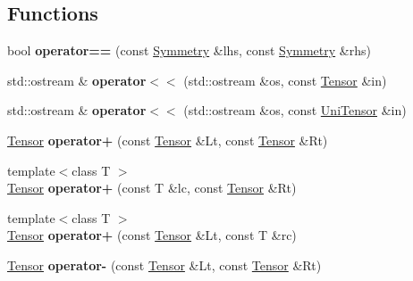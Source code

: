 \subsection*{Functions}
\begin{DoxyCompactItemize}
\item 
\mbox{\label{namespacecytnx_ae6b20189964ca74ff03eb7565dc0b8cd}} 
bool {\bfseries operator==} (const \hyperlink{classcytnx_1_1Symmetry}{Symmetry} \&lhs, const \hyperlink{classcytnx_1_1Symmetry}{Symmetry} \&rhs)
\item 
\mbox{\label{namespacecytnx_a651e9fae9c180966bc3655999e473a78}} 
std\+::ostream \& {\bfseries operator$<$$<$} (std\+::ostream \&os, const \hyperlink{classcytnx_1_1Tensor}{Tensor} \&in)
\item 
\mbox{\label{namespacecytnx_a82ae0f76259f95cfe10256e8c3454921}} 
std\+::ostream \& {\bfseries operator$<$$<$} (std\+::ostream \&os, const \hyperlink{classcytnx_1_1UniTensor}{Uni\+Tensor} \&in)
\item 
\mbox{\label{namespacecytnx_a067e7063e7cc7a80c9c91d8998ab7134}} 
\hyperlink{classcytnx_1_1Tensor}{Tensor} {\bfseries operator+} (const \hyperlink{classcytnx_1_1Tensor}{Tensor} \&Lt, const \hyperlink{classcytnx_1_1Tensor}{Tensor} \&Rt)
\item 
\mbox{\label{namespacecytnx_a75a3787e9b9565f0bc90d19453d1ffa5}} 
{\footnotesize template$<$class T $>$ }\\\hyperlink{classcytnx_1_1Tensor}{Tensor} {\bfseries operator+} (const T \&lc, const \hyperlink{classcytnx_1_1Tensor}{Tensor} \&Rt)
\item 
\mbox{\label{namespacecytnx_a9b46a4945621a40fc5e23bbea0576b1a}} 
{\footnotesize template$<$class T $>$ }\\\hyperlink{classcytnx_1_1Tensor}{Tensor} {\bfseries operator+} (const \hyperlink{classcytnx_1_1Tensor}{Tensor} \&Lt, const T \&rc)
\item 
\mbox{\label{namespacecytnx_a5a476408cdb97a10fa2330a5d6b4934c}} 
\hyperlink{classcytnx_1_1Tensor}{Tensor} {\bfseries operator-\/} (const \hyperlink{classcytnx_1_1Tensor}{Tensor} \&Lt, const \hyperlink{classcytnx_1_1Tensor}{Tensor} \&Rt)

\end{DoxyCompactItemize}
